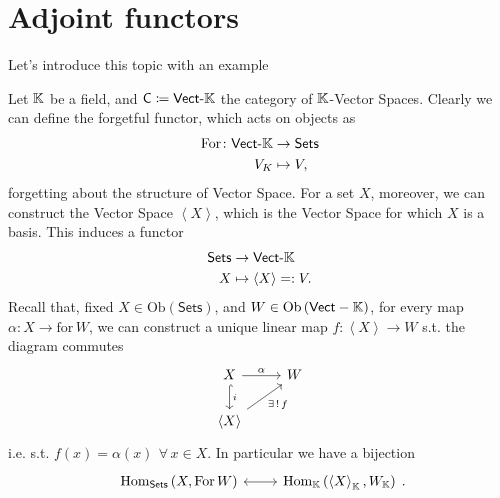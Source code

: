 \section{Adjoint functors}
Let's introduce this topic with an example
\begin{ex}
	Let $\mathbb{K}$ be a field, and $\mathsf{C} \coloneqq \mathsf{Vect}\text{-}\mathbb{K}$ the category of $\mathbb{K}$-Vector Spaces.
	Clearly we can define the forgetful functor, which acts on objects as
	\begin{align}
		\mathrm{For}\colon \mathsf{Vect}\text{-}\mathbb{K} &\to \mathsf{Sets} \\
		V_K &\mapsto V
	,\end{align} 
	forgetting about the structure of Vector Space.
	For a set $X$, moreover, we can construct the Vector Space $\left\langle X \right\rangle$,
	which is the Vector Space  for which $X$ is a basis.
	This induces a functor
	\begin{align}
		 \mathsf{Sets} &\to \mathsf{Vect}\text{-}\mathbb{K} \\
		 X&\mapsto \left\langle X \right\rangle =: V
	.\end{align} 
	Recall that, fixed $X \in \mathrm{Ob} \left(\mathsf{Sets}\right)$, and $W \in \mathrm{Ob} \left(\mathsf{Vect}-\mathbb{K}\right)$,
	for every map $\alpha\colon X \to \mathrm{for}\, W$, we can construct a unique linear map
	$f\colon \left\langle X \right\rangle \to W$ s.t. the diagram commutes
	\begin{equation}
	\begin{tikzcd}
		X \arrow[r, "\alpha", rightarrow] \arrow[d, "i", hookrightarrow] &
		W\\
		\left\langle X \right\rangle \arrow[ru, "\exists\, !\, f"', rightarrow] &
	\end{tikzcd}
	\end{equation} 
	i.e. s.t. $f(x) = \alpha(x)\ \,\forall\, x \in X$.
	In particular we have a bijection
	\begin{equation}
	\begin{tikzcd}
		\mathrm{Hom}_{\mathsf{Sets}} \left( X, \mathrm{For}\, W \right) \arrow[r, "", leftrightarrow] &
		\mathrm{Hom}_{\K} \left( \left\langle X \right\rangle_{\K}, W_{\K} \right)
	\end{tikzcd}
	.\end{equation} 
\end{ex} 

